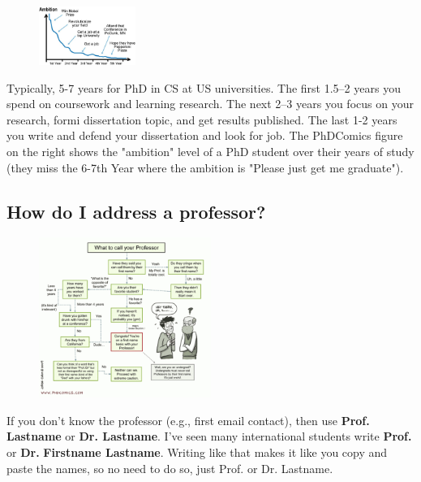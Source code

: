 \documentclass[11pt]{article}
\begin{document}
\begin{figure}
    \vspace{-0.4in}
      \begin{center}
        \includegraphics[width=0.28\textwidth]{c4a.png}
      \end{center}
    \vspace{-0.2in}
    \end{figure}
    Typically, 5-7 years for PhD in CS at US universities.  The first 1.5--2 years you spend on coursework and learning research.  The next 2--3 years you focus on your research, formi dissertation topic, and get results published.  The last 1-2 years you write and defend your dissertation and look for job. The PhDComics figure on the right shows the "ambition" level of a PhD student over their years of study (they miss the 6-7th Year where the ambition is "Please just get me graduate").



\subsection{How do I address a professor?}

\begin{figure}
    \vspace{-0.4in}
      \begin{center}
        \includegraphics[width=0.5\textwidth]{c5.png}
      \end{center}
    \vspace{-0.9in}
    \end{figure}
If you don't know the professor (e.g., first email contact), then use \textbf{Prof. Lastname} or \textbf{Dr. Lastname}. I've seen many international students write \textbf{Prof.} or \textbf{Dr.} \textbf{Firstname Lastname}.  Writing like that makes it like you copy and paste the names, so no need to do so,  just Prof. or Dr. Lastname.
        
\end{document}
